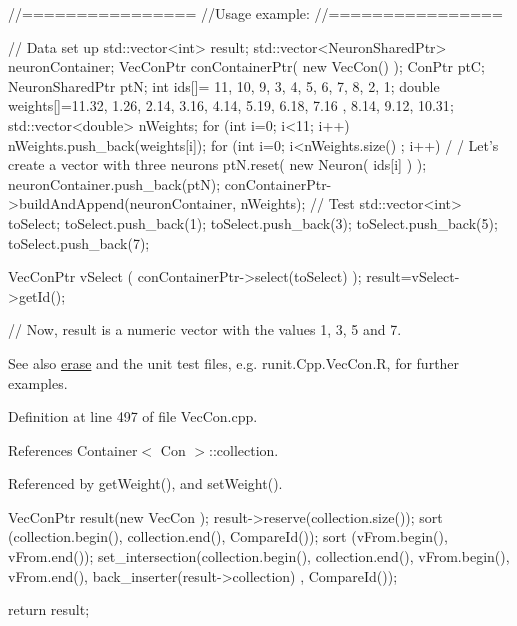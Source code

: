 \begin{DoxyCode}
        //================
        //Usage example:
        //================

        // Data set up
                std::vector<int> result;
                std::vector<NeuronSharedPtr> neuronContainer;
                VecConPtr conContainerPtr( new VecCon() );
                ConPtr    ptC;
                NeuronSharedPtr ptN;
                int ids[]= {11, 10, 9, 3, 4, 5, 6, 7, 8, 2, 1};
                double weights[]={11.32, 1.26, 2.14, 3.16, 4.14, 5.19, 6.18, 7.16
      , 8.14, 9.12, 10.31};
                std::vector<double> nWeights;
                for (int i=0; i<11; i++) {
                        nWeights.push_back(weights[i]);
                }
                for (int i=0; i<nWeights.size() ; i++) {                         /
      / Let's create a vector with three neurons
                        ptN.reset( new Neuron( ids[i] ) );
                        neuronContainer.push_back(ptN);
                }
                conContainerPtr->buildAndAppend(neuronContainer, nWeights);
                // Test
                std::vector<int> toSelect;
                toSelect.push_back(1);
                toSelect.push_back(3);
                toSelect.push_back(5);
                toSelect.push_back(7);

                VecConPtr  vSelect (  conContainerPtr->select(toSelect)  );
                result=vSelect->getId();

                // Now, result is a numeric vector with the values 1, 3, 5 and 7.
      
\end{DoxyCode}


\begin{DoxySeeAlso}{See also}
\hyperlink{classvec_con_aa9cc2fde90ddf466e820f929ead4fb0b}{erase} and the unit test files, e.g. runit.Cpp.VecCon.R, for further examples. 
\end{DoxySeeAlso}


Definition at line 497 of file VecCon.cpp.



References Container$<$ Con $>$::collection.



Referenced by getWeight(), and setWeight().


\begin{DoxyCode}
                                                     {
        VecConPtr result(new VecCon );
        result->reserve(collection.size());
        sort (collection.begin(), collection.end(), CompareId());
        sort (vFrom.begin(), vFrom.end());
        set_intersection(collection.begin(), collection.end(), vFrom.begin(), vFrom.end(), 
      back_inserter(result->collection) , CompareId());

        return result;
}
\end{DoxyCode}


